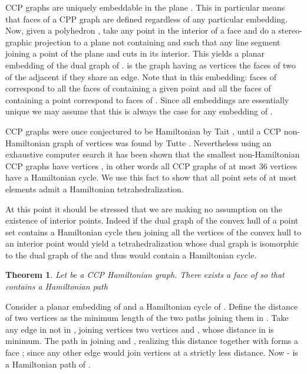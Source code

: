 \documentclass{article}
\newtheorem{theorem}{Theorem}
\def\QED{\ensuremath{{\square}}}
\def\markatright#1{\leavevmode\unskip\nobreak\quad\hspace*{\fill}{#1}}
\newenvironment{proof}
  {\begin{trivlist}\item[\hskip\labelsep{\bf Proof.}]}
  {\markatright{\QED}\end{trivlist}}
\begin{document}
CCP graphs are uniquely embeddable in the plane \cite{whitney}. This
in particular means that faces of a CPP graph are defined regardless of any particular 
embedding. Now, given a polyhedron , take any point  in the interior 
of a face and do a stereo-graphic projection to a plane not containing 
and such that any line segment joining a point of the plane and  cuts
 in its interior. This yields a planar embedding of the dual graph 
 of .  is the graph having as vertices
the faces of  two of the adjacent if they share an edge.
Note that in this embedding: faces of
 correspond to all the faces of  containing a given point 
and all the faces of  containing a point correspond to faces of 
. Since all embeddings are essentially unique we may assume that this is 
always the case for any embedding of .\par

CCP graphs were once conjectured to be Hamiltonian by Tait \cite{tait}, until a
CCP non-Hamiltonian graph of 
 vertices was found by Tutte \cite{tutte}. Nevertheless
using an exhaustive computer search it has been shown that the smallest non-Hamiltonian CCP graphs have  vertices \cite{nonham}, in other words all CCP graphs of at most 36 vertices
have a Hamiltonian cycle.
We use this fact to show that all point sets of at most  elements admit
a Hamiltonian tetrahedralization.\par

At this point it should be stressed that we are making no assumption
on the existence of interior points. Indeed if the dual graph of the
convex hull of a point set contains a Hamiltonian cycle then joining all the vertices
of the convex hull to an interior point would yield a tetrahedralization whose dual graph
is isomorphic to the dual graph of the  and thus would contain a Hamiltonian cycle.

\begin{theorem}\label{eyeham}
Let  be a CCP Hamiltonian graph. There exists a face  
of  so that  contains a Hamiltonian path
\end{theorem}
\begin{proof}

Consider a planar embedding of  and a Hamiltonian
cycle  of . Define the distance of two vertices 
as the minimum length of the two paths joining them in .
Take any edge  in  not in , joining vertices two vertices  and ,
 whose distance in  is minimum. The path  in  joining  and , realizing this
distance together with  forms a face ; since any other edge
would join vertices at a strictly less distance.
Now - is a Hamiltonian path of .
\end{proof}
\end{document}
